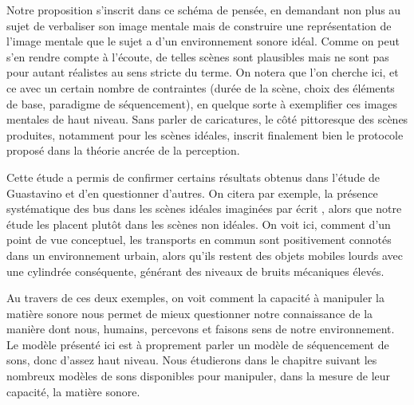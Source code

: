   Notre proposition s'inscrit dans ce schéma de pensée, en demandant non plus au sujet de verbaliser son image mentale mais de \og construire \fg une représentation de l'image mentale que le sujet a d'un environnement sonore idéal. Comme on peut s'en rendre compte à l'écoute, de telles scènes sont plausibles mais ne sont pas pour autant réalistes au sens stricte du terme. On notera que l'on cherche ici, et ce avec un certain nombre de contraintes (durée de la scène, choix des éléments de base, paradigme de séquencement), en quelque sorte à exemplifier ces images mentales de haut niveau. Sans parler de caricatures, le côté pittoresque des scènes produites, notamment pour les scènes idéales, inscrit finalement bien le protocole proposé dans la théorie ancrée de la perception.

  Cette étude a permis de confirmer certains résultats obtenus dans l'étude de Guastavino\cite{guastavino2006ideal} et d'en questionner d'autres. On citera par exemple, la présence systématique des bus dans les scènes idéales imaginées \og par écrit \fg, alors que notre étude les placent plutôt dans les scènes non idéales. On voit ici, comment d'un point de vue conceptuel, les transports en commun sont positivement connotés dans un environnement urbain, alors qu'ils restent des objets mobiles lourds avec une cylindrée conséquente, générant des niveaux de bruits mécaniques élevés\cite{lafayhal-01111782}.

  Au travers de ces deux exemples, on voit comment la capacité à manipuler la matière sonore nous permet de mieux questionner notre connaissance de la manière dont nous, humains, percevons et faisons sens de notre environnement. Le modèle présenté ici est à proprement parler un modèle de séquencement de sons, donc d'assez haut niveau. Nous étudierons dans le chapitre suivant les nombreux modèles de sons disponibles pour manipuler, dans la mesure de leur capacité, la matière sonore. %


